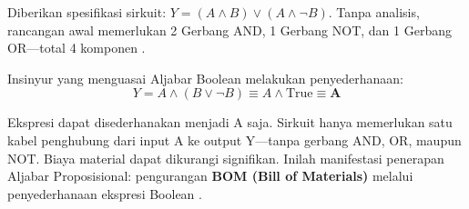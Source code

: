 Diberikan spesifikasi sirkuit: \textbf{$Y = (A \land B) \lor (A \land \neg B)$}. Tanpa analisis, rancangan awal memerlukan 2 Gerbang AND, 1 Gerbang NOT, dan 1 Gerbang OR---total 4 komponen \cite{levin_discrete}.

Insinyur yang menguasai Aljabar Boolean melakukan penyederhanaan:
$$ Y = A \land (B \lor \neg B) \equiv A \land \text{True} \equiv \textbf{A} $$

Ekspresi dapat disederhanakan menjadi A saja. Sirkuit hanya memerlukan satu kabel penghubung dari input A ke output Y---tanpa gerbang AND, OR, maupun NOT. Biaya material dapat dikurangi signifikan.
Inilah manifestasi penerapan Aljabar Proposisional: pengurangan \textbf{BOM (Bill of Materials)} melalui penyederhanaan ekspresi Boolean \cite{grinnell_logic,hackatronic}.
